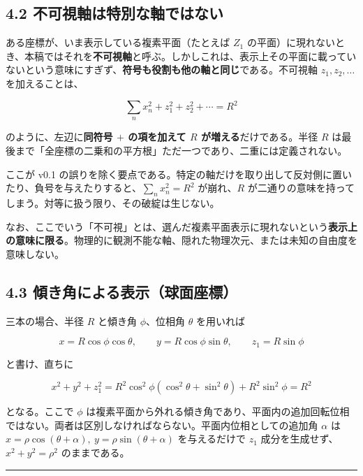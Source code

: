 \documentclass[11pt,a4paper]{ltjsarticle}
\begin{document}
\subsection{4.2
不可視軸は特別な軸ではない}\label{ux4e0dux53efux8996ux8ef8ux306fux7279ux5225ux306aux8ef8ux3067ux306fux306aux3044}

ある座標が、いま表示している複素平面（たとえば \(Z_1\)
の平面）に現れないとき、本稿ではそれを\textbf{不可視軸}と呼ぶ。しかしこれは、表示上その平面に載っていないという意味にすぎず、\textbf{符号も役割も他の軸と同じ}である。不可視軸
\(z_1,z_2,\dots\) を加えることは、

\[
\sum_n x_n^2 + z_1^2 + z_2^2 + \cdots = R^2
\]

のように、左辺に\textbf{同符号 \(+\) の項を加えて \(R\)
が増える}だけである。半径 \(R\)
は最後まで「全座標の二乗和の平方根」ただ一つであり、二重には定義されない。

ここが v0.1
の誤りを除く要点である。特定の軸だけを取り出して反対側に置いたり、負号を与えたりすると、\(\sum_n x_n^2=R^2\)
が崩れ、\(R\)
が二通りの意味を持ってしまう。対等に扱う限り、その破綻は生じない。

なお、ここでいう「不可視」とは、選んだ複素平面表示に現れないという\textbf{表示上の意味に限る}。物理的に観測不能な軸、隠れた物理次元、または未知の自由度を意味しない。

\subsection{4.3
傾き角による表示（球面座標）}\label{ux50beux304dux89d2ux306bux3088ux308bux8868ux793aux7403ux9762ux5ea7ux6a19}

三本の場合、半径 \(R\) と傾き角 \(\phi\)、位相角 \(\theta\) を用いれば

\[
x=R\cos\phi\cos\theta,\qquad y=R\cos\phi\sin\theta,\qquad z_1=R\sin\phi
\]

と書け、直ちに

\[
x^2+y^2+z_1^2
=R^2\cos^2\phi(\cos^2\theta+\sin^2\theta)+R^2\sin^2\phi
=R^2
\]

となる。ここで \(\phi\)
は複素平面から外れる傾き角であり、平面内の追加回転位相ではない。両者は区別しなければならない。平面内位相としての追加角
\(\alpha\) は \(x=\rho\cos(\theta+\alpha),\ y=\rho\sin(\theta+\alpha)\)
を与えるだけで \(z_1\) 成分を生成せず、\(x^2+y^2=\rho^2\) のままである。

\begin{center}\rule{0.5\linewidth}{0.5pt}\end{center}
\end{document}
